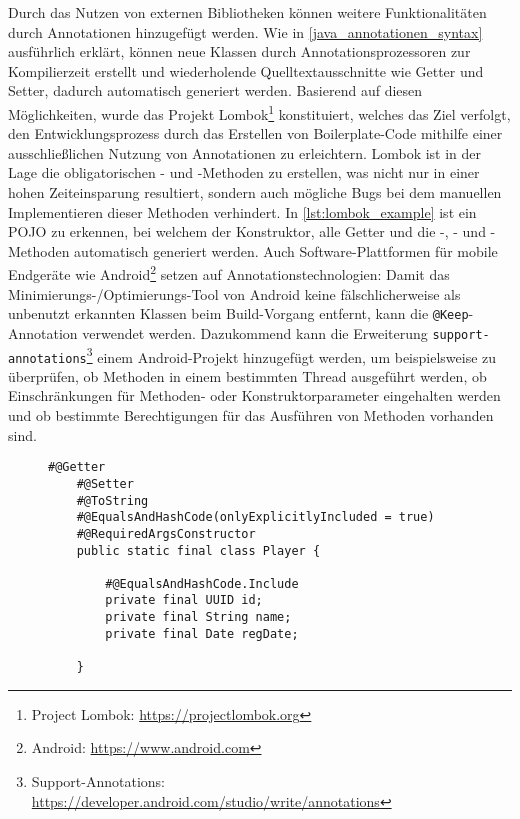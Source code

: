 \noindent Durch das Nutzen von externen Bibliotheken können weitere Funktionalitäten durch Annotationen hinzugefügt werden. Wie in \autoref{java_annotationen_syntax} ausführlich erklärt, können neue Klassen durch Annotationsprozessoren zur Kompilierzeit erstellt und wiederholende Quelltextausschnitte wie Getter und Setter, dadurch automatisch generiert werden. Basierend auf diesen Möglichkeiten, wurde das Projekt Lombok\footnote{Project Lombok: \url{https://projectlombok.org}} konstituiert, welches das Ziel verfolgt, den Entwicklungsprozess durch das Erstellen von Boilerplate-Code mithilfe einer ausschließlichen Nutzung von Annotationen zu erleichtern. Lombok ist in der Lage die obligatorischen - und -Methoden zu erstellen, was nicht nur in einer hohen Zeiteinsparung resultiert, sondern auch mögliche Bugs bei dem manuellen Implementieren dieser Methoden verhindert. In \autoref{lst:lombok_example} ist ein POJO zu erkennen, bei welchem der Konstruktor, alle Getter und die -, - und -Methoden automatisch generiert werden. Auch Software-Plattformen für mobile Endgeräte wie Android\footnote{Android: \url{https://www.android.com}} setzen auf Annotationstechnologien: Damit das Minimierungs-/Optimierungs-Tool von Android keine fälschlicherweise als unbenutzt erkannten Klassen beim Build-Vorgang entfernt, kann die \texttt{@Keep}-Annotation verwendet werden. Dazukommend kann die Erweiterung \texttt{support-annotations}\footnote{Support-Annotations: \url{https://developer.android.com/studio/write/annotations}} einem Android-Projekt hinzugefügt werden, um beispielsweise zu überprüfen, ob Methoden in einem bestimmten Thread ausgeführt werden, ob Einschränkungen für Methoden- oder Konstruktorparameter eingehalten werden und ob bestimmte Berechtigungen für das Ausführen von Methoden vorhanden sind.

\begin{figure}[H]
	\begin{lstlisting}[caption=Beispiel -- Lombok POJO., captionpos=b, label=lst:lombok_example]
	#@Getter
	#@Setter
	#@ToString
	#@EqualsAndHashCode(onlyExplicitlyIncluded = true)
	#@RequiredArgsConstructor
	public static final class Player {

		#@EqualsAndHashCode.Include
		private final UUID id;
		private final String name;
		private final Date regDate;

	}
	\end{lstlisting}
\end{figure}

